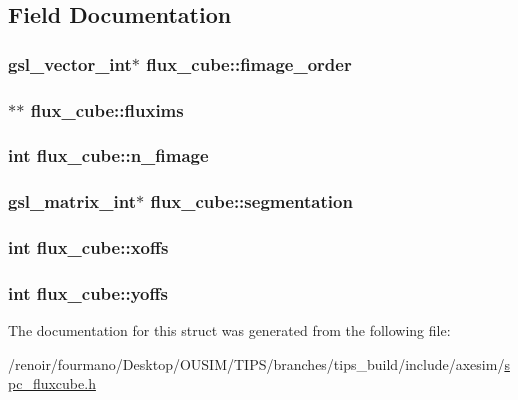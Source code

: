 \subsection{Field Documentation}
\hypertarget{structflux__cube_a4ec5facf29796f861f62aadd0661f946}{
\subsubsection[{fimage\_\-order}]{\setlength{\rightskip}{0pt plus 5cm}gsl\_\-vector\_\-int$\ast$ {\bf flux\_\-cube::fimage\_\-order}}}
\label{structflux__cube_a4ec5facf29796f861f62aadd0661f946}
\hypertarget{structflux__cube_ab8326cc76fb87ffb4aa998f1f3a11cc7}{
\subsubsection[{fluxims}]{$\ast$$\ast$ {\bf flux\_\-cube::fluxims}}}
\label{structflux__cube_ab8326cc76fb87ffb4aa998f1f3a11cc7}
\hypertarget{structflux__cube_ad2a0926e5395663598768f3e09a14c69}{
\subsubsection[{n\_\-fimage}]{\setlength{\rightskip}{0pt plus 5cm}int {\bf flux\_\-cube::n\_\-fimage}}}
\label{structflux__cube_ad2a0926e5395663598768f3e09a14c69}
\hypertarget{structflux__cube_a5003df20f749b61b1b9ba3818460ca0c}{
\subsubsection[{segmentation}]{\setlength{\rightskip}{0pt plus 5cm}gsl\_\-matrix\_\-int$\ast$ {\bf flux\_\-cube::segmentation}}}
\label{structflux__cube_a5003df20f749b61b1b9ba3818460ca0c}
\hypertarget{structflux__cube_aed8b9a141c8fd3f09022f27ca0f7d670}{
\subsubsection[{xoffs}]{\setlength{\rightskip}{0pt plus 5cm}int {\bf flux\_\-cube::xoffs}}}
\label{structflux__cube_aed8b9a141c8fd3f09022f27ca0f7d670}
\hypertarget{structflux__cube_a0ac57c4e5fe235758efb4a7ca70e5d29}{
\subsubsection[{yoffs}]{\setlength{\rightskip}{0pt plus 5cm}int {\bf flux\_\-cube::yoffs}}}
\label{structflux__cube_a0ac57c4e5fe235758efb4a7ca70e5d29}


The documentation for this struct was generated from the following file:\begin{DoxyCompactItemize}
\item 
/renoir/fourmano/Desktop/OUSIM/TIPS/branches/tips\_\-build/include/axesim/\hyperlink{spc__fluxcube_8h}{spc\_\-fluxcube.h}\end{DoxyCompactItemize}
